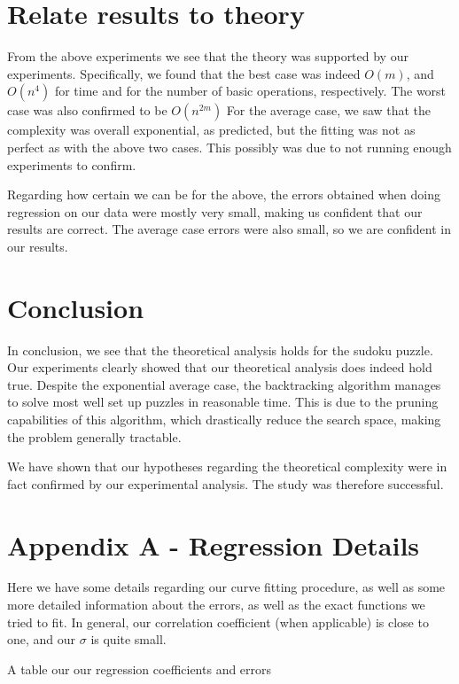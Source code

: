 \documentclass[16pt]{article}
\begin{document}
\section{Relate results to theory}
From the above experiments we see that the theory was supported by our experiments.
Specifically, we found that the best case was indeed $O(m)$, and $O(n^4)$ for time and for the number of basic operations, respectively.
\newline
\newline
The worst case was also confirmed to be $O(n^{2m})$
\newline
\newline
For the average case, we saw that the complexity was overall exponential, as predicted, but the fitting was not as perfect as with the above two cases.
This possibly was due to not running enough experiments to confirm.

Regarding how certain we can be for the above, the errors obtained when doing regression on our data were mostly very small, making us confident that our results are correct.
The average case errors were also small, so we are confident in our results.
\section{Conclusion}
In conclusion, we see that the theoretical analysis holds for the sudoku puzzle.
Our experiments clearly showed that our theoretical analysis does indeed hold true.
\newline
Despite the exponential average case, the backtracking algorithm manages to solve most well set up puzzles in reasonable time.
This is due to the pruning capabilities of this algorithm, which drastically reduce the search space, making the problem generally tractable.

We have shown that our hypotheses regarding the theoretical complexity were in fact confirmed by our experimental analysis.
The study was therefore successful.




\section{Appendix A - Regression Details}
Here we have some details regarding our curve fitting procedure, as well as some more detailed information about the errors, as well as the exact functions we tried to fit.
In general, our correlation coefficient (when applicable) is close to one, and our $\sigma$ is quite small.
\newline
\newline
\begin{table}[h!]
\makebox[\textwidth][c]{
    
}
\caption{A table our our regression coefficients and errors}
\end{table}
\end{document}
